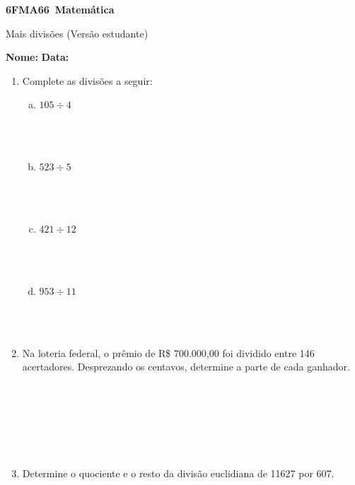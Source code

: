 \documentclass[a4paper,14pt]{article}
\begin{document}
	
	\noindent\textbf{6FMA66~Matemática} 
	
	\begin{center}Mais divisões (Versão estudante)
	\end{center}
	
	\noindent\textbf{Nome:} \underline{\hspace{10cm}}
	\noindent\textbf{Data:} \underline{\hspace{4cm}}
	
	
	
    \begin{multicols}{2}
    	\begin{enumerate}
    		\item Complete as divisões a seguir:
    		\begin{enumerate}[a)]
    			\item $105 \div 4$ \\\\\\\\
    			\item $523 \div 5$ \\\\\\\\
    			\item $421 \div 12$ \\\\\\\\
    			\item $953 \div 11$ \\\\\\\\
    		\end{enumerate}
    		\item Na loteria federal, o prêmio de R\$ 700.000,00 foi dividido entre 146 acertadores. Desprezando os centavos, determine a parte de cada ganhador.\\\\\\\\\\\\\\
    		\item Determine o quociente e o resto da divisão euclidiana de 11627 por 607. \\\\\\\\\\\\

\end{enumerate}
\end{multicols}
\end{document}
